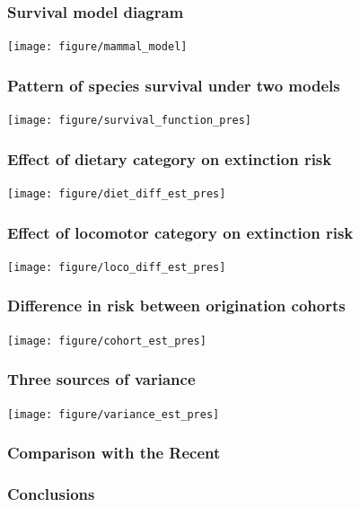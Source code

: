 \documentclass{beamer}
\begin{document}
\begin{frame}
  \frametitle{Survival model diagram}
  \begin{center}
    \texttt{[image: figure/mammal\_model]}
  \end{center}
\end{frame}

\begin{frame}
  \frametitle{Pattern of species survival under two models}
  
  \texttt{[image: figure/survival\_function\_pres]}
\end{frame}

\begin{frame}
  \frametitle{Effect of dietary category on extinction risk}
  
  \texttt{[image: figure/diet\_diff\_est\_pres]}
\end{frame}

\begin{frame}
  \frametitle{Effect of locomotor category on extinction risk}
  
  \texttt{[image: figure/loco\_diff\_est\_pres]}
\end{frame}

\begin{frame}
  \frametitle{Difference in risk between origination cohorts}
  
  \texttt{[image: figure/cohort\_est\_pres]}
\end{frame}

\begin{frame}
  \frametitle{Three sources of variance}
  
  \texttt{[image: figure/variance\_est\_pres]}
\end{frame}

\begin{frame}
  \frametitle{Comparison with the Recent}
\end{frame}

\begin{frame}
  \frametitle{Conclusions}
\end{frame}
\end{document}
